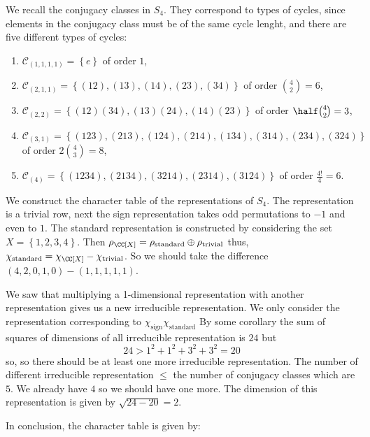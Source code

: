 \documentclass[12pt, a4paper]{article}
\begin{document}
We recall the conjugacy classes in \(S_4\). They correspond to types of cycles, since elements in the conjugacy class must be of the same cycle lenght, and there are five different types of cycles:
\begin{enumerate}
    \item \(\mathcal{C}_{(1,1,1,1)}=\left\{ e \right\}\) of order \(1\),
    \item \(\mathcal{C}_{(2,1,1)} = \left\{ (12),(13),(14),(23),(34) \right\}\) of order \(\binom{4}{2}=6\),
    \item \(\mathcal{C}_{(2,2)} = \left\{ (12)(34),(13)(24),(14)(23) \right\}\) of order \(\half\binom{4}{2}=3\),
    \item \(\mathcal{C}_{(3,1)} = \left\{ (123),(213),(124),(214),(134),(314),(234),(324) \right\}\) of order \(2\binom{4}{3}=8\),
    \item \(\mathcal{C}_{(4)} = \left\{ (1234),(2134),(3214),(2314),(3124) \right\}\) of order \(\frac{4!}{4}=6\).
\end{enumerate}

We construct the character table of the representations of \(S_4\). The representation is a trivial row, next the sign representation takes odd permutations to \(-1\) and even to \(1\). The standard representation is constructed by considering the set \(X = \left\{ 1,2,3,4 \right\}\). Then \(\rho_{\CC[X]} = \rho_{\text{standard}}\oplus \rho_{\text{trivial}}\)  thus, \(\chi_{\text{standard}}=\chi_{\CC[X]}-\chi_{\text{trivial}}\). So we should take the difference \((4,2,0,1,0)-(1,1,1,1,1)\). 

We saw that multiplying a 1-dimensional representation with another representation gives us a new irreducible representation. We only consider the representation corresponding to \(\chi_{\text{sign}}\chi_{\text{standard}}\) By some corollary the sum of squares of dimensions of all irreducible representation is \(24\) but 
\[24>1^2+1^2+3^2+3^2 =20\]
so, so there should be at least one more irreducible representation. The number of different irreducible representation \(\leq\) the number of conjugacy classes which are \(5\). We already have \(4\) so we should have one more. The dimension of this representation is given by \(\sqrt{24-20}=2\). 

In conclusion, the character table is given by:
\end{document}
